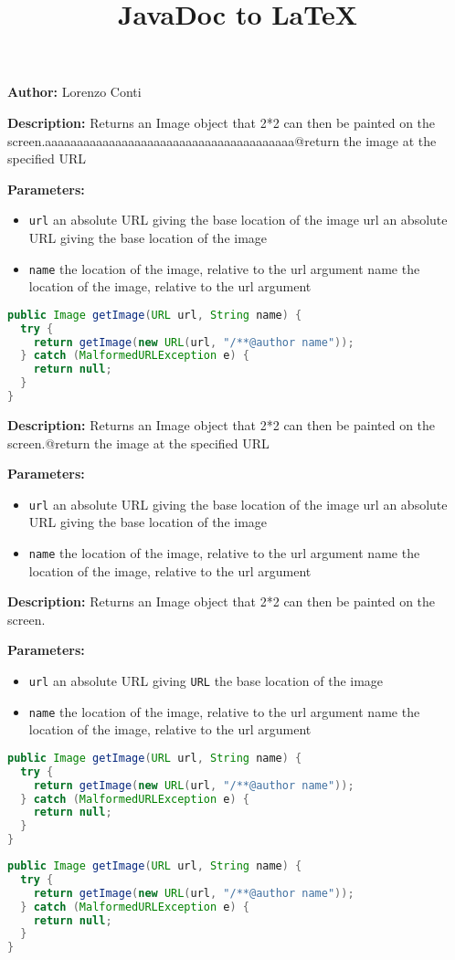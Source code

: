\documentclass{article}
\title{JavaDoc to LaTeX}
\begin{document}
\textbf{Author:} Lorenzo Conti

\textbf{Description:}
Returns an Image object that 2*2 can then be painted on the screen.aaaaaaaaaaaaaaaaaaaaaaaaaaaaaaaaaaaaaaa@return the image at the specified URL

\textbf{Parameters:}
\begin{itemize}
  \item\texttt{url}  an absolute URL giving the base location of the image url  an absolute URL giving the base location of the image
  \item\texttt{name} the location of the image, relative to the url argument name the location of the image, relative to the url argument
\end{itemize}

\begin{lstlisting}[language=Java]
public Image getImage(URL url, String name) {
  try {
    return getImage(new URL(url, "/**@author name"));
  } catch (MalformedURLException e) {
    return null;
  }
}
\end{lstlisting}
\textbf{Description:}
Returns an Image object that 2*2 can then be painted on the screen.@return      the image at the specified URL

\textbf{Parameters:}
\begin{itemize}
  \item\texttt{url}  an absolute URL giving the base location of the image url  an absolute URL giving the base location of the image
  \item\texttt{name} the location of the image, relative to the url argument name the location of the image, relative to the url argument
\end{itemize}

\textbf{Description:}
Returns an Image object that 2*2 can then be painted on the screen.

\textbf{Parameters:}
\begin{itemize}
  \item\texttt{url}  an absolute URL giving  \texttt{URL}  the base location of the image
  \item\texttt{name} the location of the image, relative to the url argument name the location of the image, relative to the url argument
\end{itemize}

\begin{lstlisting}[language=Java]
public Image getImage(URL url, String name) {
  try {
    return getImage(new URL(url, "/**@author name"));
  } catch (MalformedURLException e) {
    return null;
  }
}
\end{lstlisting}
\begin{lstlisting}[language=Java]
public Image getImage(URL url, String name) {
  try {
    return getImage(new URL(url, "/**@author name"));
  } catch (MalformedURLException e) {
    return null;
  }
}
\end{lstlisting}
\end{document}
